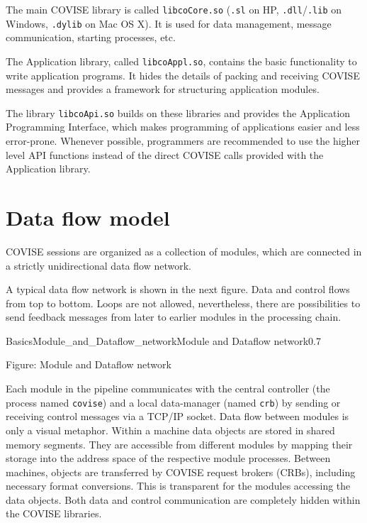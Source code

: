 The main COVISE library is called {\tt libcoCore.so}
({\tt .sl} on HP, \texttt{.dll}/\texttt{.lib} on Windows, \texttt{.dylib} on Mac OS X).
It is used for data management, message communication, starting processes, etc.

The Application library, called {\tt libcoAppl.so}, contains the basic functionality to 
write application programs. It hides the details of packing and receiving COVISE 
messages and provides a framework for structuring application modules.

The library {\tt libcoApi.so} builds on these libraries and provides the
Application Programming Interface, which makes programming of applications
easier and less error-prone.
Whenever possible, programmers are recommended to use the higher level API
functions instead of the direct COVISE calls provided with the Application library.

\section{Data flow model}
\latexonly
{}
\endlatexonly

COVISE sessions are organized as a collection of modules, which are connected in a 
strictly unidirectional data flow network.

A typical data flow network is shown in the next figure.  Data and control flows from top to 
bottom. Loops are not allowed, nevertheless, there are possibilities to send feedback 
messages from later to earlier modules in the processing chain.

\begin{covimg}{Basics}{Module_and_Dataflow_network}{Module and Dataflow network}{0.7}\
\end{covimg}
\begin{htmlonly}
Figure: Module and Dataflow network
\vspace*{1cm}
\end{htmlonly}

Each module in the pipeline communicates with the central controller
(the process named \texttt{covise}) and a local 
data-manager (named \texttt{crb}) by sending or receiving control messages via a TCP/IP socket. 
Data flow between modules is only a visual metaphor. Within a machine data objects are 
stored in shared memory segments. They are accessible from different modules by mapping
their storage into the address space of the respective module processes. Between 
machines, objects are transferred by COVISE request brokers (CRBs), including necessary 
format conversions. This is transparent for the modules accessing the data objects. 
Both data and control communication are completely hidden within the
COVISE libraries.

